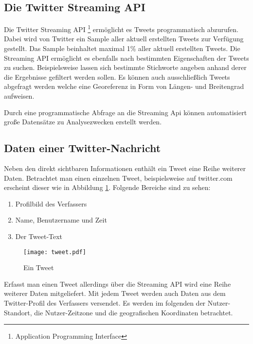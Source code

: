 		\subsection{Die Twitter Streaming API}

			Die Twitter Streaming API \footnote{Application Programming Interface} ermöglicht es Tweets programmatisch abzurufen.
			Dabei wird von Twitter ein Sample aller aktuell erstellten Tweets zur Verfügung gestellt.  
			Das Sample beinhaltet maximal 1\% aller aktuell erstellten Tweets.
			Die Streaming API ermöglicht es ebenfalls nach bestimmten Eigenschaften der Tweets zu suchen.
			Beispielsweise lassen sich bestimmte Stichworte angeben anhand derer die Ergebnisse gefiltert werden sollen.
			Es können auch ausschließlich Tweets abgefragt werden welche eine Georeferenz in Form von Längen- und Breitengrad aufweisen. 

			Durch eine programmatische Abfrage an die Streaming Api können automatisiert große Datensätze zu Analysezwecken erstellt werden. 

		\subsection{Daten einer Twitter-Nachricht} \label{sub:DatenInTwitterNachricht} 
			
			Neben den direkt sichtbaren Informationen enthält ein Tweet eine Reihe weiterer Daten.
			Betrachtet man einen einzelnen Tweet, beispielsweise auf twitter.com erscheint dieser wie in Abbildung \ref{img:tweet}.
			Folgende Bereiche sind zu sehen:

			\begin{enumerate}
				\item Profilbild des Verfassers
				\item Name, Benutzername und Zeit
				\item Der Tweet-Text
			\end{enumerate}


			\begin{figure}[h!]
			\begin{center}
			\texttt{[image: tweet.pdf]}
			\caption{Ein Tweet}
			\label{img:tweet}
			\end{center}
			\end{figure}	


			Erfasst man einen Tweet allerdings über die Streaming API wird eine Reihe weiterer Daten mitgeliefert.
			Mit jedem Tweet werden auch Daten aus dem Twitter-Profil des Verfassers versendet.
			Es werden im folgenden der Nutzer-Standort, die Nutzer-Zeitzone und die geografischen Koordinaten betrachtet.

